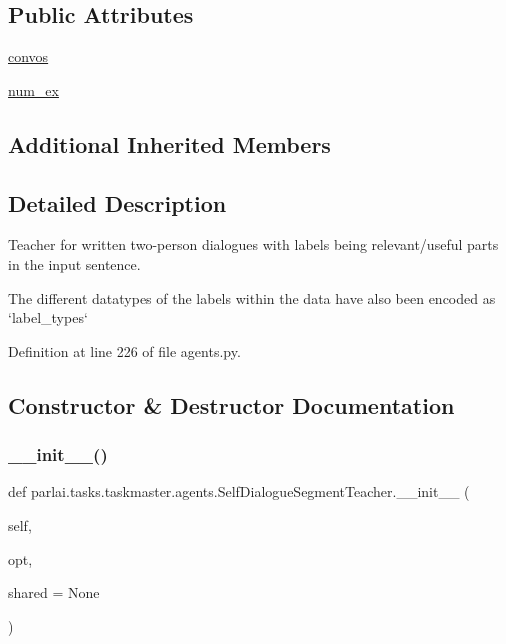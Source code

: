 \subsection*{Public Attributes}
\begin{DoxyCompactItemize}
\item 
\hyperlink{classparlai_1_1tasks_1_1taskmaster_1_1agents_1_1SelfDialogueSegmentTeacher_aced6b44c6ab5da0943ebd6f16acc5339}{convos}
\item 
\hyperlink{classparlai_1_1tasks_1_1taskmaster_1_1agents_1_1SelfDialogueSegmentTeacher_a231381551fe76fdbf333c0fd8c671b5e}{num\+\_\+ex}
\end{DoxyCompactItemize}
\subsection*{Additional Inherited Members}


\subsection{Detailed Description}
\begin{DoxyVerb}Teacher for written two-person dialogues with labels being relevant/useful parts in
the input sentence.

The different datatypes of the labels within the data have also been encoded as
`label_types`
\end{DoxyVerb}
 

Definition at line 226 of file agents.\+py.



\subsection{Constructor \& Destructor Documentation}
\mbox{\label{classparlai_1_1tasks_1_1taskmaster_1_1agents_1_1SelfDialogueSegmentTeacher_a508d7db21bcb258cbeb1d89c5f33d6a3}} 
\subsubsection{\texorpdfstring{\+\_\+\+\_\+init\+\_\+\+\_\+()}{\_\_init\_\_()}}
{\footnotesize\ttfamily def parlai.\+tasks.\+taskmaster.\+agents.\+Self\+Dialogue\+Segment\+Teacher.\+\_\+\+\_\+init\+\_\+\+\_\+ (\begin{DoxyParamCaption}\item[{}]{self,  }\item[{}]{opt,  }\item[{}]{shared = {\ttfamily None} }\end{DoxyParamCaption})}



